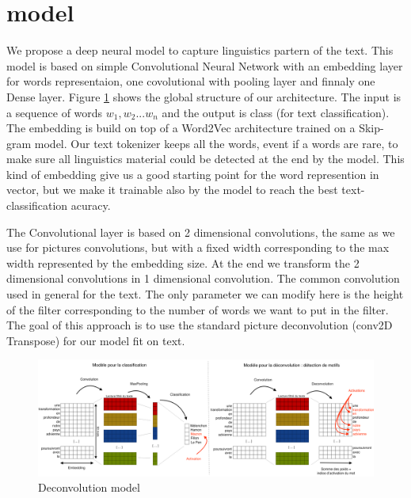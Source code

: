 \section{model}

We propose a deep neural model to capture linguistics partern of the text. This model is based on simple Convolutional Neural Network with an embedding layer for words representaion, one covolutional with pooling layer and finnaly one Dense layer. Figure \ref{cnn} shows the global structure of our architecture. The input is a sequence of words $ w_{1}, w_{2} ... w_{n} $ and the output is class (for text classification). The embedding is build on top of a Word2Vec architecture trained on a Skip-gram model. Our text tokenizer keeps all the words, event if a words are rare, to make sure all linguistics material could be detected at the end by the model. This kind of embedding give us a good starting point for the word represention in vector, but we make it trainable also by the model to reach the best text-classification acuracy. 

The Convolutional layer is based on 2 dimensional convolutions, the same as we use for pictures convolutions, but with a fixed width corresponding to the max width represented by the embedding size. At the end we transform the 2 dimensional convolutions in 1 dimensional convolution. The common convolution used in general for the text. The only parameter we can modify here is the height of the filter corresponding to the number of words we want to put in the filter. The goal of this approach is to use the standard picture deconvolution (conv2D Transpose) for our model fit on text.

\begin{figure}[h]
\begin{center}
\includegraphics[width=16cm]{img/model.png}
\caption{Deconvolution model}
\label{cnn}
\end{center}
\end{figure}


